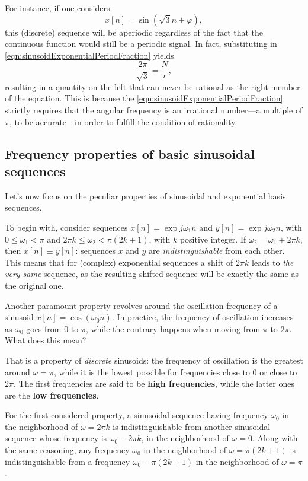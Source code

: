 \documentclass[\documentfontsize, twocolumn]{\classname}
\begin{document}
For instance, if one considers \[x[n] = \sin{(\sqrt{3}n + \varphi)},\] this (discrete) se\-quen\-ce will be aperiodic regardless of the fact that the continuous function would still be a periodic signal. In fact, substituting in \ref{eqn:sinusoidExponentialPeriodFraction} yields \[\frac{2\pi}{\sqrt{3}} = \frac N r,\] resulting in a quantity on the left that can never be rational as the right member of the equation. This is because the \ref{eqn:sinusoidExponentialPeriodFraction} strictly requires that the angular frequency is an irrational number---a multiple of $\pi$, to be accurate---in order to fulfill the condition of rationality.

\subsection{Frequency properties of basic sinusoidal se\-quen\-ces}

Let's now focus on the peculiar properties of sinusoidal and exponential basis se\-quen\-ces.

To begin with, consider se\-quen\-ces $x[n] = \exp{j \omega_1 n}$ and $y[n] = \exp{j \omega_2 n}$, with $0 \leq \omega_1 < \pi$ and $2 \pi k \leq \omega_2 < \pi(2k+1)$, with $k$ positive integer. If $\omega_2 = \omega_1 + 2 \pi k$, then $x[n] \equiv y[n]$: se\-quen\-ces $x$ and $y$ are \emph{indistinguishable} from each other. This means that for (complex) exponential se\-quen\-ces a shift of $2\pi k$ leads to \emph{the very same} se\-quen\-ce, as the resulting shifted se\-quen\-ce will be exactly the same as the original one.

Another paramount property revolves around the oscillation frequency of a sinusoid $x[n]=\cos{(\omega_0 n)}$. In practice, the frequency of oscillation increases as $\omega_0$ goes from $0$ to $\pi$, while the contrary happens when moving from $\pi$ to $2\pi$. What does this mean?

That is a property of \emph{discrete} sinusoids: the frequency of oscillation is the greatest around $\omega=\pi$, while it is the lowest possible for frequencies close to $0$ or close to $2\pi$. The first frequencies are said to be \textbf{high frequencies}, while the latter ones are the \textbf{low frequencies}.

For the first considered property, a sinusoidal se\-quen\-ce having frequency $\omega_0$ in the neighborhood of $\omega=2\pi k$ is indistinguishable from another sinusoidal se\-quen\-ce whose frequency is $\omega_0 - 2 \pi k$, in the neighborhood of $\omega = 0$. Along with the same reasoning, any frequency $\omega_0$ in the neighborhood of $\omega = \pi (2k + 1)$ is indistinguishable from a frequency $\omega_0 - \pi(2k + 1)$ in the neighborhood of $\omega = \pi$.
\end{document}
